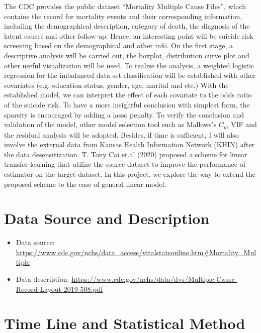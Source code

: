 \documentclass[a4paper]{article}
\begin{document}
The CDC provides the public dataset “Mortality Multiple Cause Files”, which contains the record for mortality events and their corresponding information, including the demographical description, category of death, the diagnosis of the latent causes and other follow-up. Hence, an interesting point will be suicide risk screening based on the demographical and other info. On the first stage, a descriptive analysis will be carried out, the boxplot, distribution curve plot and other useful visualization will be used. To realize the analysis, a weighted logistic regression for the imbalanced data set classification will be established with other covariates (e.g. education status, gender, age, marital and etc.) With the established model, we can interpret the effect of each covariate to the odds ratio of the suicide risk. To have a more insightful conclusion with simplest form, the sparsity is encouraged by adding a lasso penalty. To verify the conclusion and validation of the model, other model selection tool such as Mallows's $C_p$, VIF and the residual analysis will be adopted.
Besides, if time is sufficient, I will also involve the external data from Kansas Health Information Network (KHIN) after the data desensitization. T. Tony Cai et.al (2020) proposed a scheme for linear transfer learning that utilize the source dataset to improve the performance of estimator on the target dataset. In this project, we explore the way to extend the proposed scheme to the case of general linear model.


\section{Data Source and Description}
\small
\begin{itemize}
	\item Data source: \url{https://www.cdc.gov/nchs/data_access/vitalstatsonline.htm#Mortality_Multiple}
	\item Data description: \url{https://www.cdc.gov/nchs/data/dvs/Multiple-Cause-Record-Layout-2019-508.pdf}
\end{itemize}
\normalsize
\section{Time Line and Statistical Method}
\end{document}
